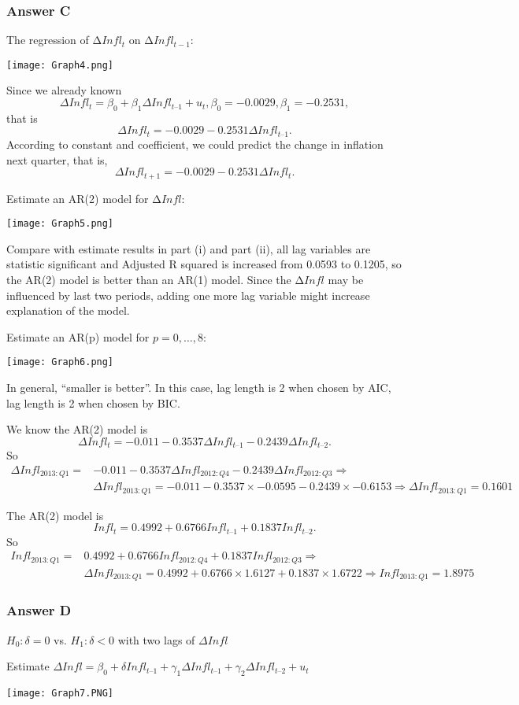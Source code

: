 \documentclass{beamer}
\begin{document}
	\begin{frame}[allowframebreaks]
		\frametitle{Answer C}
			
			The regression of $∆Infl_t$ on $∆Infl_{t-1}:$
			\pause
			
			\texttt{[image: Graph4.png]}
			
			Since we already known 
			\[ΔInfl_t = β_0 + β_1ΔInfl_{t–1} + u_t, β_0 =-0.0029, β_1 =-0.2531,\] that is 
			\[ΔInfl_t = -0.0029- 0.2531ΔInfl_{t–1}.\] 
			According to constant and coefficient, we could predict the change in inflation next quarter, that is, 
			\[ΔInfl_{t+1} = -0.0029- 0.2531ΔInfl_t.\]
			\vspace{11pt}
			
			
			Estimate an AR(2) model for $∆Infl:$
			\pause
			
			\texttt{[image: Graph5.png]}
			
			Compare with estimate results in part (i) and part (ii), all lag variables are statistic significant and Adjusted R squared is increased from 0.0593 to 0.1205, so the AR(2) model is better than an AR(1) model.
			Since the $∆Infl$ may be influenced by last two periods, adding one more lag variable might increase explanation of the model.
			\vspace{11pt}
			
			
			Estimate an AR(p) model for $p=0,…,8:$
			\pause
			
			\texttt{[image: Graph6.png]}
			
			In general, “smaller is better”. In this case, lag length is 2 when chosen by AIC, lag length is 2 when chosen by BIC.
			\vspace{11pt}
			
			
			We know the AR(2) model is 
			\[ΔInfl_t = -0.011- 0.3537ΔInfl_{t–1} - 0.2439ΔInfl_{t–2}.\]
			So
			\[\begin{aligned}
			ΔInfl_{2013:Q1} ={}& -0.011- 0.3537ΔInfl_{2012:Q4} - 0.2439ΔInfl_{2012:Q3}\Rightarrow\\
			&ΔInfl_{2013:Q1} = -0.011- 0.3537×-0.0595 - 0.2439×-0.6153\Rightarrow ΔInfl_{2013:Q1}=0.1601
			\end{aligned}\]
			\vspace{11pt}
			
			
			The AR(2) model is 
			\[Infl_t = 0.4992+ 0.6766Infl_{t–1} + 0.1837Infl_{t–2}.\]
			So 
			\[\begin{aligned}
			Infl_{2013:Q1} ={}& 0.4992+ 0.6766Infl_{2012:Q4} + 0.1837Infl_{2012:Q3}\Rightarrow\\
			&ΔInfl_{2013:Q1} = 0.4992+ 0.6766×1.6127 + 0.1837×1.6722\Rightarrow Infl_{2013:Q1}=1.8975
			\end{aligned}\]
	\end{frame}
	\begin{frame}[allowframebreaks]
		\frametitle{Answer D}
		
		$H_0: δ = 0$ vs. $H_1: δ < 0$ with two lags of $ΔInfl$
		
		Estimate $ΔInfl= β_0 + δInfl_{t–1} + γ_1ΔInfl_{t–1} + γ_2ΔInfl_{t–2} +u_t$
		
		\texttt{[image: Graph7.PNG]}

	\end{frame}
\end{document}
